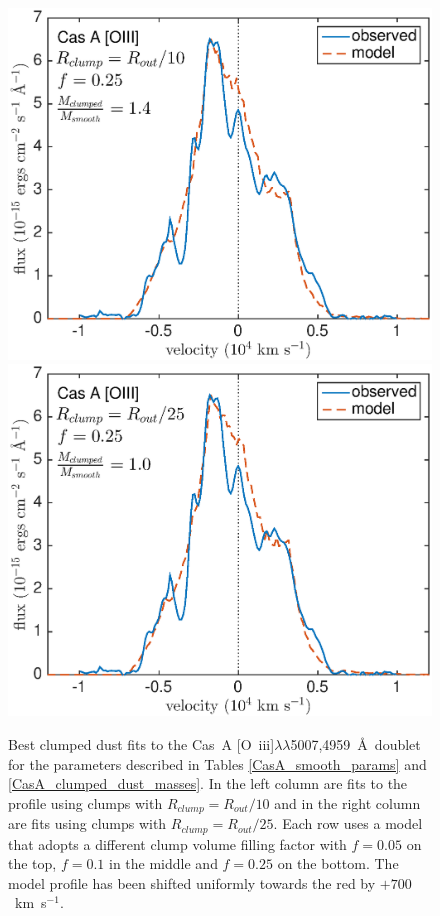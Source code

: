 \begin{figure}
\vspace{6mm}
\includegraphics[scale=0.43,clip=true, trim=30 0 50 20]{chapters/chapter6/figs/CasA/clumped/CasA_OIII_c10_f0_25}
\includegraphics[scale=0.43,clip=true, trim=30 0 40 20]{chapters/chapter6/figs/CasA/clumped/CasA_OIII_c25_f0_25}

\caption{Best clumped dust fits to the Cas~A [O~{\sc iii}]$\lambda\lambda$5007,4959~\AA\ doublet for the parameters described in Tables \ref{CasA_smooth_params} and \ref{CasA_clumped_dust_masses}.  In the left column are fits to the profile using clumps with $R_{clump}=R_{out}/10$ and in the right column are fits using clumps with $R_{clump}=R_{out}/25$.  Each row uses a model that adopts a different clump volume filling factor with $f=0.05$ on the top, $f=0.1$ in the middle and $f=0.25$ on the bottom.  The model profile has been shifted uniformly towards the red by $+700$~km~s$^{-1}$.}
\label{CasA_OIII_clumped}
\end{figure}

